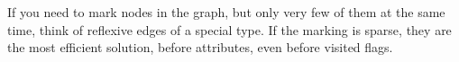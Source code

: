 \begin{note}
If you need to mark nodes in the graph, but only very few of them at the same time, think of reflexive edges of a special type. If the marking is sparse, they are the most efficient solution, before attributes, even before visited flags.
\end{note}




